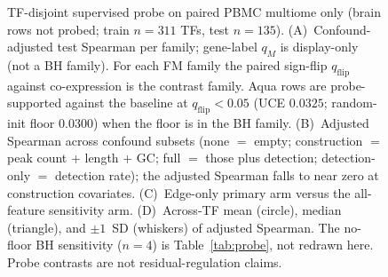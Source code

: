 \documentclass[fleqn,10pt,lineno]{wlpeerj}
\newcommand{\fitfig}[1]{\resizebox{\ifdim\width>\linewidth\linewidth\else\width\fi}{!}{#1}}
\begin{document}
\begin{figure}[!tbp]\centering
\fitfig{}
\caption{TF-disjoint supervised probe on paired PBMC multiome only (brain rows not probed;
train $n=311$ TFs, test $n=135$). (A)~Confound-adjusted test Spearman per family; gene-label
$q_M$ is display-only (not a BH family). For each FM family the paired sign-flip
$q_{\mathrm{flip}}$ against co-expression is the contrast family. Aqua rows are probe-supported
against the baseline at $q_{\mathrm{flip}}<0.05$ (UCE
$0.0325$; random-init floor $0.0300$) when the floor is in the BH family. (B)~Adjusted Spearman
across confound subsets (none $=$ empty; construction $=$ peak count + length + GC; full $=$ those
plus detection; detection-only $=$ detection rate); the adjusted Spearman falls to near zero at
construction covariates. (C)~Edge-only primary arm versus the all-feature sensitivity arm.
(D)~Across-TF mean (circle), median (triangle), and $\pm 1$~SD (whiskers) of adjusted Spearman.
The no-floor BH sensitivity ($n=4$) is Table~\ref{tab:probe}, not redrawn here.
Probe contrasts are not residual-regulation claims.}\label{fig:probe}
\end{figure}
\FloatBarrier

\begin{table}[H]\centering
\fitfig{}
\caption{TF-disjoint probe numeric contrasts on paired PBMC multiome only (eight brain rows
omitted). A linear probe is trained on 311 TFs and tested on 135 disjoint TFs; $\bar{\rho}_{\mathrm{probe}}$ is the
confound-adjusted mean test Spearman. $\Delta\rho$ vs base is versus co-expression. Paired
sign-flip $q_{\mathrm{flip}}$ is BH on $n=5$ contrasts (four FM families plus the random-init
floor); the no-floor column recomputes BH on the $n=4$ FM contrasts excluding the floor (UCE
moves to $q=0.052$). Probe ``supported'' contrasts mean the baseline is over-corrected further below
zero, not that the FM recovers residual regulation.}\label{tab:probe}
\end{table}
\FloatBarrier
\end{document}
